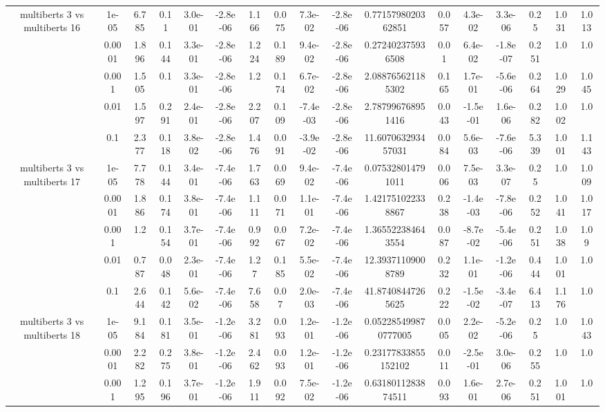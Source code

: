 \begin{tabular}{|c|c|c|c|c|c|c|c|c|c|c|c|c|c|c|c|c|}
\hline
\multirow{5}{*}{multiberts 3 vs multiberts 16} & 1e-05 & 6.785 & 0.11 & 3.0e-01 & -2.8e-06 & 1.166 & 0.075 & 7.3e-02 & -2.8e-06 & 0.7715798020362851 & 0.057 & 4.3e-02 & 3.3e-06 & 0.25 & 1.031 & 1.013 \\
 & 0.0001 & 1.896 & 0.144 & 3.3e-01 & -2.8e-06 & 1.224 & 0.189 & 9.4e-02 & -2.8e-06 & 0.272402375936508 & 0.01 & 6.4e-02 & -1.8e-07 & 0.251 & 1.0 & 1.0 \\
 & 0.001 & 1.505 & 0.1 & 3.3e-01 & -2.8e-06 & 1.2 & 0.174 & 6.7e-02 & -2.8e-06 & 2.088765621185302 & 0.165 & 1.7e-01 & -5.6e-06 & 0.264 & 1.029 & 1.045 \\
 & 0.01 & 1.597 & 0.291 & 2.4e-01 & -2.8e-06 & 2.207 & 0.109 & -7.4e-03 & -2.8e-06 & 2.787996768951416 & 0.043 & -1.5e-01 & 1.6e-06 & 0.282 & 1.002 & 1.0 \\
 & 0.1 & 2.377 & 0.118 & 3.8e-02 & -2.8e-06 & 1.476 & 0.091 & -3.9e-02 & -2.8e-06 & 11.607063293457031 & 0.084 & 5.6e-03 & -7.6e-06 & 5.339 & 1.001 & 1.143 \\
\hline
\multirow{5}{*}{multiberts 3 vs multiberts 17} & 1e-05 & 7.778 & 0.144 & 3.4e-01 & -7.4e-06 & 1.763 & 0.069 & 9.4e-02 & -7.4e-06 & 0.075328014791011 & 0.006 & 7.5e-03 & 3.3e-07 & 0.25 & 1.0 & 1.009 \\
 & 0.0001 & 1.886 & 0.174 & 3.8e-01 & -7.4e-06 & 1.111 & 0.071 & 1.1e-01 & -7.4e-06 & 1.421751022338867 & 0.238 & -1.4e-03 & -7.8e-06 & 0.252 & 1.041 & 1.017 \\
 & 0.001 & 1.2 & 0.154 & 3.7e-01 & -7.4e-06 & 0.992 & 0.067 & 7.2e-02 & -7.4e-06 & 1.365522384643554 & 0.087 & -8.7e-02 & -5.4e-06 & 0.251 & 1.038 & 1.09 \\
 & 0.01 & 0.787 & 0.048 & 2.3e-01 & -7.4e-06 & 1.27 & 0.185 & 5.5e-02 & -7.4e-06 & 12.39371109008789 & 0.232 & 1.1e-01 & -1.2e-06 & 0.444 & 1.001 & 1.0 \\
 & 0.1 & 2.644 & 0.142 & 5.6e-02 & -7.4e-06 & 7.658 & 0.07 & 2.0e-03 & -7.4e-06 & 41.87408447265625 & 0.222 & -1.5e-02 & -3.4e-07 & 6.413 & 1.176 & 1.0 \\
\hline
\multirow{5}{*}{multiberts 3 vs multiberts 18} & 1e-05 & 9.184 & 0.181 & 3.5e-01 & -1.2e-06 & 3.281 & 0.093 & 1.2e-01 & -1.2e-06 & 0.052285499870777005 & 0.005 & 2.2e-02 & -5.2e-06 & 0.25 & 1.0 & 1.043 \\
 & 0.0001 & 2.282 & 0.275 & 3.8e-01 & -1.2e-06 & 2.462 & 0.093 & 1.2e-01 & -1.2e-06 & 0.23177833855152102 & 0.011 & -2.5e-01 & 3.0e-06 & 0.255 & 1.0 & 1.0 \\
 & 0.001 & 1.295 & 0.196 & 3.7e-01 & -1.2e-06 & 1.911 & 0.092 & 7.5e-02 & -1.2e-06 & 0.6318011283874511 & 0.093 & 1.6e-01 & 2.7e-06 & 0.251 & 1.001 & 1.0 \\

\end{tabular}
